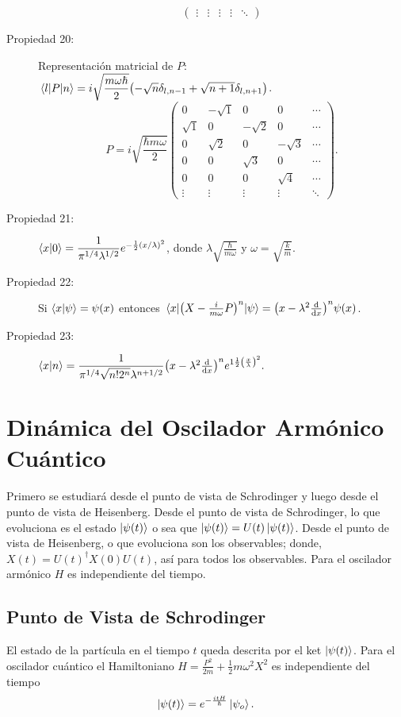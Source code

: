 \begin{description}
$$\begin{pmatrix}
\vdots & \vdots & \vdots & \vdots & \ddots
\end{pmatrix} $$
	\item[Propiedad 20: ] Representación matricial de $P$: $\mel{l}{P}{n} = i\sqrt{\dfrac{m\omega \hbar}{2}} \qty(-\sqrt{n} \delta _{l,n-1} + \sqrt{n+1} \delta _{l,n+1})$.
		$$ P = i \sqrt{\frac{\hbar m \omega}{2}}
\begin{pmatrix}
0 & -\sqrt{1} & 0 & 0 & \cdots \\
\sqrt{1} & 0 & -\sqrt{2} & 0 & \cdots \\
0 & \sqrt{2} & 0 & -\sqrt{3} & \cdots \\
0 & 0 & \sqrt{3} & 0 & \cdots \\
0 & 0 & 0 & \sqrt{4} & \cdots \\
\vdots & \vdots & \vdots & \vdots & \ddots
\end{pmatrix}. $$
	\item[Propiedad 21: ] $\braket{x}{0} = \dfrac{1}{\pi ^{1/4} \lambda ^{1/2}} e^{-\frac{1}{2} \qty(x/\lambda)^2}$, donde $\lambda \sqrt{\frac{\hbar}{m\omega}}$ y $\omega = \sqrt{\frac{k}{m}}$.
	\item[Propiedad 22: ] Si $\braket{x}{\psi} = \psi (x)$ entonces $\mel{x}{\qty(X - \frac{i}{m\omega} P)^n}{\psi} = \qty(x - \lambda ^2 \dv{x})^n \psi (x)$.
	\item[Propiedad 23: ] $\braket{x}{n} = \dfrac{1}{\pi ^{1/4} \sqrt{n! 2^n} \lambda ^{n + 1/2}} \qty(x - \lambda ^2 \dv{x})^n e^{1\frac{1}{2} \qty(\frac{x}{\lambda})^2}. $
\end{description}


\section{Dinámica del Oscilador Armónico Cuántico}
Primero se estudiará desde el punto de vista de Schrodinger y luego desde el punto de vista de Heisenberg. Desde el punto de vista de Schrodinger, lo que evoluciona es el estado $\ket{\psi (t)}$ o sea que $\ket{\psi (t)} = U(t) \ket{\psi (t)}$. Desde el punto de vista de Heisenberg, o que evoluciona son los observables; donde, $X(t) = U(t) ^\dagger X(0) U(t)$, así para todos los observables. Para el oscilador armónico $H$ es independiente del tiempo.

\subsection{Punto de Vista de Schrodinger}
El estado de la partícula en el tiempo $t$ queda descrita por el ket $\ket{\psi (t)}$. Para el oscilador cuántico el Hamiltoniano $H = \frac{P^2}{2m} + \frac{1}{2} m\omega ^2 X^2$ es independiente del tiempo
	$$ \ket{\psi (t)} = e^{-\frac{itH}{\hbar}} \ket{\psi _o}. $$
	
